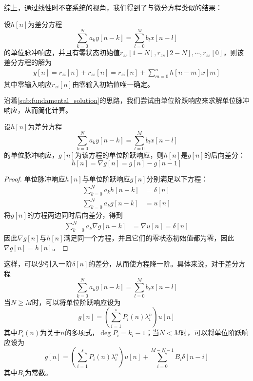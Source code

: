 综上，通过线性时不变系统的视角，我们得到了与微分方程类似的结果：
\begin{theorem}
    设$h[n]$为差分方程
    $$\sum_{k=0}^{N}a_k y[n-k] = \sum_{l=0}^{M}b_l x[n-l]$$
    的单位脉冲响应，并且有零状态初始值$r_{zs}[1-N],r_{zs}[2-N],\cdots,r_{zs}[0]$，则该差分方程的解为
    \begin{align*}
        y[n]=r_{zi}[n]+r_{zs}[n]=r_{zi}[n]+\sum_{m=0}^{n}h[n-m]x[m]
    \end{align*}
    其中零输入响应$r_{zi}[n]$由零输入初始值唯一确定。
\end{theorem}

沿着\ref{sub:fundamental_solution}的思路，我们尝试由单位阶跃响应来求解单位脉冲响应，从而简化计算。

\begin{lemma}
    设$h[n]$为差分方程
    $$\sum_{k=0}^{N}a_k y[n-k] = \sum_{l=0}^{M}b_l x[n-l]$$
    的单位脉冲响应，$g[n]$为该方程的单位阶跃响应，则$h[n]$是$g[n]$的后向差分：
    $$h[n]=\nabla g[n]=g[n]-g[n-1]$$
\end{lemma}
\begin{proof}
    单位脉冲响应$h[n]$与单位阶跃响应$g[n]$分别满足以下方程：
    \begin{align*}
        \sum_{k=0}^{N}a_k h[n-k] &= \delta[n]\\
        \sum_{k=0}^{N}a_k g[n-k] &= u[n]
    \end{align*}
    将$g[n]$的方程两边同时后向差分，得到\begin{align*}
    \sum_{k=0}^{N}a_k \nabla g[n-k] &= \nabla u[n]=\delta[n]
    \end{align*}
    因此$\nabla g[n]$与$h[n]$满足同一个方程，并且它们的零状态初始值都为零，因此$\nabla g[n]=h[n]$。
\end{proof}

这样，可以少引入一阶$\delta[n]$的差分，从而使方程降一阶。具体来说，对于差分方程
$$\sum_{k=0}^{N}a_k y[n-k] = \sum_{l=0}^{M}b_l x[n-l]$$
当$N\geq M$时，可以将单位阶跃响应设为
$$g[n]=\left(\sum_{i=1}^s P_i(n) \lambda_i^n \right)u[n]$$
其中$P_i(n)$为关于$n$的多项式，$\deg P_i=k_i-1$；当$N<M$时，可以将单位阶跃响应设为
$$g[n]=\left(\sum_{i=1}^s P_i(n) \lambda_i^n \right)u[n]+\sum_{i=0}^{M-N-1}B_i\delta[n-i]$$
其中$B_i$为常数。

